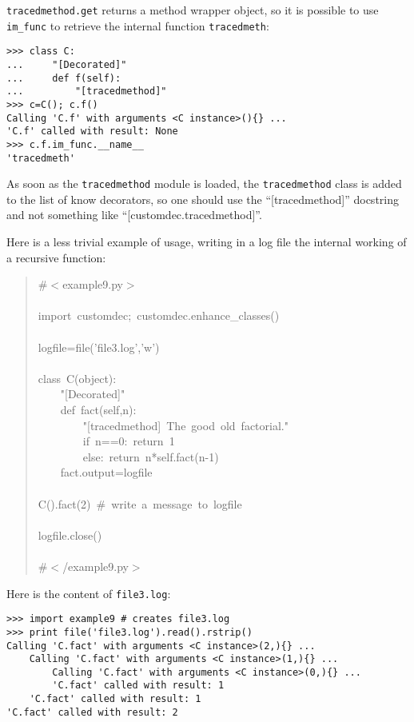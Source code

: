 \documentclass[11pt,english]{article}
\begin{document}
\texttt{tracedmethod.get} returns a method wrapper object, so it is
possible to use \texttt{im{\_}func} to retrieve the internal function
\texttt{tracedmeth}:
\begin{verbatim}>>> class C:
...     "[Decorated]"
...     def f(self):
...         "[tracedmethod]"
>>> c=C(); c.f() 
Calling 'C.f' with arguments <C instance>(){} ...
'C.f' called with result: None
>>> c.f.im_func.__name__
'tracedmeth'\end{verbatim}

As soon as the \texttt{tracedmethod} module is loaded, the \texttt{tracedmethod} class
is added to the list of know decorators, so one should use the  
``[tracedmethod]'' docstring and not something like
``[customdec.tracedmethod]''.

Here is a less trivial example of usage, writing in a log file the 
internal working of a recursive function:
\begin{quote}
\begin{ttfamily}\begin{flushleft}
\mbox{{\#}{$<$}example9.py{$>$}}\\
\mbox{}\\
\mbox{import~customdec;~customdec.enhance{\_}classes()}\\
\mbox{}\\
\mbox{logfile=file('file3.log','w')}\\
\mbox{}\\
\mbox{class~C(object):}\\
\mbox{~~~~"[Decorated]"}\\
\mbox{~~~~def~fact(self,n):}\\
\mbox{~~~~~~~~"[tracedmethod]~The~good~old~factorial."}\\
\mbox{~~~~~~~~if~n==0:~return~1}\\
\mbox{~~~~~~~~else:~return~n*self.fact(n-1)}\\
\mbox{~~~~fact.output=logfile}\\
\mbox{}\\
\mbox{C().fact(2)~{\#}~write~a~message~to~logfile}\\
\mbox{}\\
\mbox{logfile.close()}\\
\mbox{}\\
\mbox{{\#}{$<$}/example9.py{$>$}}
\end{flushleft}\end{ttfamily}
\end{quote}

Here is the content of \texttt{file3.log}:
\begin{verbatim}>>> import example9 # creates file3.log
>>> print file('file3.log').read().rstrip()
Calling 'C.fact' with arguments <C instance>(2,){} ...
    Calling 'C.fact' with arguments <C instance>(1,){} ...
        Calling 'C.fact' with arguments <C instance>(0,){} ...
        'C.fact' called with result: 1
    'C.fact' called with result: 1
'C.fact' called with result: 2\end{verbatim}
\end{document}
